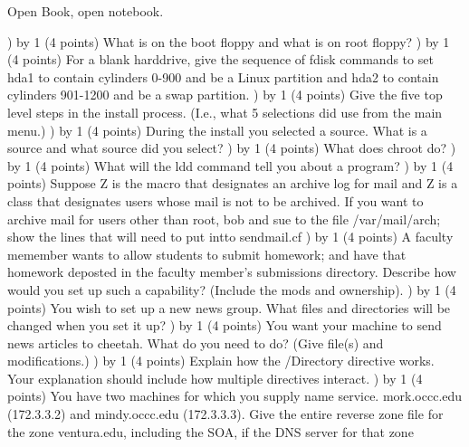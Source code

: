 
\parindent=0in
\nopagenumbers
\newcount\quesno
{}
\def\ques{\number\quesno) \advance\quesno by 1}
\def\aspace{\vskip 1.5in}

Open Book, open notebook.

\ques
(4 points)
What is on the boot floppy and what is on root floppy?
\vskip 1.3in
\ques
(4 points)
For a blank harddrive,
give the sequence of {\ltt{}fdisk} commands to
set {\ltt{}hda1} to contain cylinders 0-900
and be a Linux partition
and {\ltt{}hda2} to contain cylinders 901-1200
and be a swap partition.
\vskip 3.0in
\ques
(4 points)
Give the five top level steps in the install process.
(I.e., what 5 selections did use from the main menu.)
\vskip 2.3in
\ques
(4 points)
During the install you selected a source.
What is a source and
what source did you select?
\vskip 0.5in
\vfill\eject
\ques
(4 points)
What does {\ltt{}chroot} do?
\vskip 1.3in
\ques
(4 points)
What will the {\ltt{}ldd} command tell you about
a program?
\vskip 0.8in
\ques
(4 points)
Suppose {\ltt{}Z} is the macro that designates an archive
log for mail and {\ltt{}Z} is a class that designates
users whose mail is not to be archived.
If you want to archive mail for users other than
{\ltt{}root}, {\ltt{}bob} and {\ltt{}sue} to the file {\ltt{}/var/mail/arch};
show the lines that will need to put intto {\ltt{}sendmail.cf}
\vskip 1.2in
\ques
(4 points)
A faculty memember wants to allow students to submit homework;
and have that homework deposted in the faculty member's
{\ltt{}submissions} directory.
Describe how would you set up such a capability? (Include the mods
and ownership).
\vskip 2.5in
\ques
(4 points)
You wish to set up a new news group.
What files and directories will be changed when
you set it up?
\vskip 1.0in
\vfill\eject
\ques
(4 points)
You want your machine to send news articles to {\ltt{}cheetah}.
What do you need to do?
(Give file(s) and modifications.)
\vskip 1.9in
\ques
(4 points)
Explain how the {\ltt{}/Directory} directive works.
Your explanation should include how multiple directives interact.
\vskip 1.5in
\ques
(4 points)
You have two machines for which you supply name service.
{\ltt{}mork.occc.edu} (172.3.3.2) and 
{\ltt{}mindy.occc.edu} (172.3.3.3).
Give the entire reverse zone file for the zone {\ltt{}ventura.edu},
including the SOA, if the DNS server for that zone
